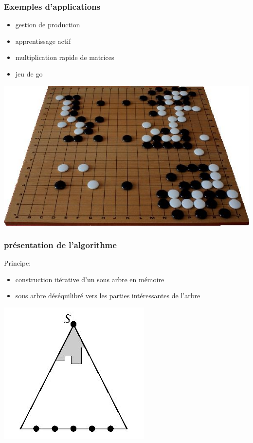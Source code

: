 \documentclass{beamer}
\begin{document}
\begin{frame}
    \frametitle{Exemples d'applications}
    \begin{itemize}
        \item gestion de production
        \item apprentissage actif
        \item multiplication rapide de matrices
        \item jeu de go
    \end{itemize}

    \begin{center}
        \includegraphics[scale=0.2]{go.jpg}
    \end{center}

\end{frame}


\begin{frame}
    \frametitle{présentation de l'algorithme}
    Principe:
    \begin{itemize}
        \item construction itérative d'un sous arbre en mémoire
        \item sous arbre déséquilibré vers les parties intéressantes de l'arbre
    \end{itemize}

    \begin{center}
        \includegraphics[scale=0.4]{arbre_desequilibre.jpg}
    \end{center}


\end{frame}
\end{document}
